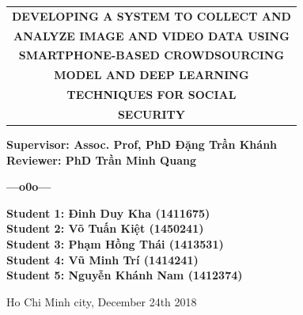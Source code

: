 \begin{titlepage}
\begin{center}
\Large
	\begin{tabular}{@{}c}
		\bfseries{DEVELOPING A SYSTEM TO COLLECT AND}\\ 
		\bfseries{ANALYZE IMAGE AND VIDEO DATA USING } \\		
		\bfseries{SMARTPHONE-BASED CROWDSOURCING} \\
		\bfseries{MODEL AND DEEP LEARNING} \\
		\bfseries{TECHNIQUES FOR SOCIAL} \\
		\bfseries{SECURITY}\\
	\end{tabular}
\end{center}
	
\hspace{3cm}	
\begin{minipage}[t]{0.8\linewidth}
\large
	\textbf{Supervisor: Assoc. Prof, PhD Đặng Trần Khánh}\\ [0.5cm]
	\textbf{Reviewer: PhD Trần Minh Quang}\\ [0.5cm]
	\vspace{-0.7cm}
	\begin{center}
	\hspace{-4cm}
	\textbf{---o0o---}
	\end{center}
	\textbf{Student 1: Đinh Duy Kha (1411675)}\\ [0.5cm]
	\textbf{Student 2: Võ Tuấn Kiệt (1450241)}\\[0.5cm]
	\textbf{Student 3: Phạm Hồng Thái (1413531)}\\[0.5cm]
	\textbf{Student 4: Vũ Minh Trí (1414241)}\\[0.5cm]
	\textbf{Student 5: Nguyễn Khánh Nam (1412374)}\\[0.5cm]
\end{minipage}

\vfill
\centerline{\large{Ho Chi Minh city, December 24th 2018}}
\end{titlepage}